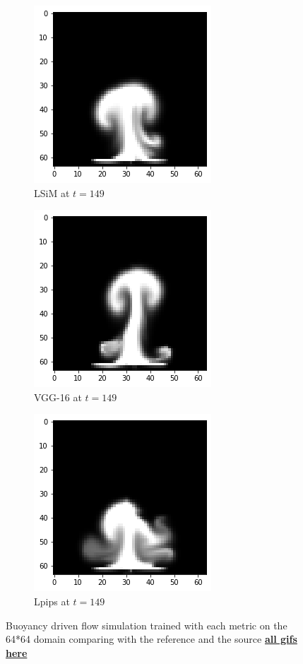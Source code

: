 \documentclass[a4paper,12pt,twoside]{report}
\begin{document}
\begin{figure}
\begin{subfigure}{0.32\textwidth}
	\end{subfigure}
	\begin{subfigure}{0.32\textwidth}
		\centering
		\includegraphics[scale=0.5]{buoyancy_low/lsim}
		\caption{LSiM at $t=149$}
	\end{subfigure}
	\begin{subfigure}{0.32\textwidth}
		\centering
		\includegraphics[scale=0.5]{buoyancy_low/vgg}
		\caption{VGG-16 at $t=149$}
	\end{subfigure}
	\begin{subfigure}{0.32\textwidth}
		\centering
		\includegraphics[scale=0.5]{buoyancy_low/lpips}
		\caption{Lpips at $t=149$}
	\end{subfigure}
	\caption{Buoyancy driven flow simulation trained with each metric on the 64*64 domain comparing with the reference and the source \href{https://github.com/w191444052/sol-data/tree/master/buoyancy_low}{\bf{all gifs here}}}
	\label{sol buoyancy low}
\end{figure}



\clearpage

\clearpage

\clearpage


%

\end{document}
